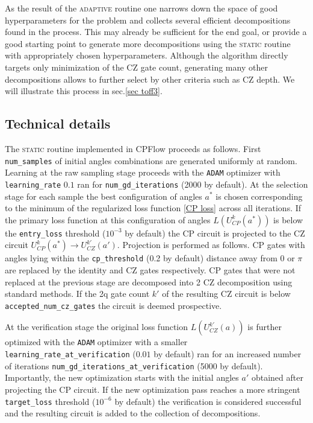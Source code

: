 \documentclass[twocolumn, amsfonts, amssymb, aps, nofootinbib]{revtex4-2}
\newcommand{\CZ}{CZ }
\newcommand{\CP}{CP }
\newcommand{\package}[1]{\textrm {#1 }}
\newcommand{\cpflow}{\package{CPFlow}}
\newcommand{\static}{\textsc{static }}
\newcommand{\adaptive}{\textsc{adaptive }}
\newcommand{\param}[1]{\texttt{#1}}
\begin{document}
As the result of the \adaptive routine one narrows down the space of good hyperparameters for the problem and collects several efficient decompositions found in the process. This may already be sufficient for the end goal, or provide a good starting point to generate more decompositions using the \static routine with appropriately chosen hyperparameters. Although the algorithm directly targets only minimization of the \CZ gate count, generating many other decompositions allows to further select by other criteria such as \CZ depth. We will illustrate this process in sec.\ref{sec toff3}.
\subsection{Technical details \label{sec details}}
The \static routine implemented in \cpflow proceeds as follows.
First \param{num\_samples} of initial angles combinations are generated uniformly at random. Learning at the raw sampling stage proceeds with the \param{ADAM} optimizer with \param{learning\_rate} $0.1$ ran for \param{num\_gd\_iterations} (2000 by default).
At the selection stage for each sample the best configuration of angles $a^*$ is chosen corresponding to the minimum of the regularized loss function \eqref{CP loss} across all iterations. If the primary loss function at this configuration of angles $L(U_{CP}^k(a^*))$ is below the \param{entry\_loss} threshold ($10^{-3}$ by default) the \CP circuit is projected to the \CZ circuit $U_{CP}^k(a^*)\to U_{CZ}^{k'}(a')$. Projection is performed as follows. \CP gates with angles lying within the \param{cp\_threshold}  (0.2 by default) distance away from $0$ or $\pi$ are replaced by the identity and \CZ gates respectively.  \CP gates that were not replaced at the previous stage are decomposed into 2 \CZ decomposition using standard methods. If the 2q gate count $k'$ of the resulting \CZ circuit is below \param{accepted\_num\_cz\_gates} the circuit is deemed prospective.

At the verification stage the original loss function $L(U_{CZ}^{k'}(a))$ is further optimized with the \param{ADAM} optimizer with a smaller \param{learning\_rate\_at\_verification} ($0.01$ by default) ran for an increased number of iterations \param{num\_gd\_iterations\_at\_verification} (5000 by default). Importantly, the new optimization starts with the initial angles $a'$ obtained after projecting the \CP circuit. If the new optimization pass reaches a more stringent \param{target\_loss} threshold ($10^{-6}$ by default) the verification is considered successful and the resulting circuit is added to the collection of decompositions. 
\end{document}
